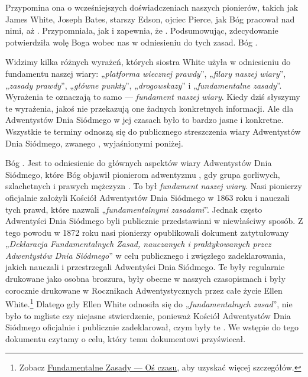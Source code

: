 Przypomina ona o wcześniejszych doświadczeniach naszych pionierów, takich jak James White, Joseph Bates, starszy Edson, ojciec Pierce, jak Bóg pracował nad nimi, aż  . Przypomniała, jak  i zapewnia, że . Podsumowując, zdecydowanie potwierdziła wolę Boga wobec nas w odniesieniu do tych zasad. Bóg .

Widzimy kilka różnych wyrażeń, których siostra White użyła w odniesieniu do fundamentu naszej wiary: „\textit{platforma wiecznej prawdy}”, „\textit{filary naszej wiary}”, „\textit{zasady prawdy}”, „\textit{główne punkty}”, „\textit{drogowskazy}” i „\textit{fundamentalne zasady}”. Wyrażenia te oznaczają to samo — \textit{fundament naszej wiary}. Kiedy dziś słyszymy te wyrażenia, jakoś nie przekazują one żadnych konkretnych informacji. Ale dla Adwentystów Dnia Siódmego w jej czasach było to bardzo jasne i konkretne. Wszystkie te terminy odnoszą się do publicznego streszczenia wiary Adwentystów Dnia Siódmego, zwanego , wyjaśnionymi poniżej.

Bóg . Jest to odniesienie do głównych aspektów wiary Adwentystów Dnia Siódmego, które Bóg objawił pionierom adwentyzmu , gdy grupa gorliwych, szlachetnych i prawych mężczyzn . To był \textit{fundament naszej wiary}. Nasi pionierzy oficjalnie założyli Kościół Adwentystów Dnia Siódmego w 1863 roku i nauczali tych prawd, które nazwali „\textit{fundamentalnymi zasadami}”. Jednak często Adwentyści Dnia Siódmego byli publicznie przedstawiani w niewłaściwy sposób. Z tego powodu w 1872 roku nasi pionierzy opublikowali dokument zatytułowany „\textit{Deklaracja Fundamentalnych Zasad, nauczanych i praktykowanych przez Adwentystów Dnia Siódmego}” w celu publicznego i zwięzłego zadeklarowania, jakich  nauczali i przestrzegali Adwentyści Dnia Siódmego. Te  były regularnie drukowane jako osobna broszura, były obecne w naszych czasopismach i były corocznie drukowane w Rocznikach Adwentystycznych przez całe życie Ellen White.\footnote{Zobacz \hyperref[appendix:timeline]{Fundamentalne Zasady — Oś czasu}, aby uzyskać więcej szczegółów.} Dlatego gdy Ellen White odnosiła się do „\textit{fundamentalnych zasad}”, nie było to mgliste czy niejasne stwierdzenie, ponieważ Kościół Adwentystów Dnia Siódmego oficjalnie i publicznie zadeklarował, czym były te . We wstępie do tego dokumentu czytamy o celu, który temu dokumentowi przyświecał.

